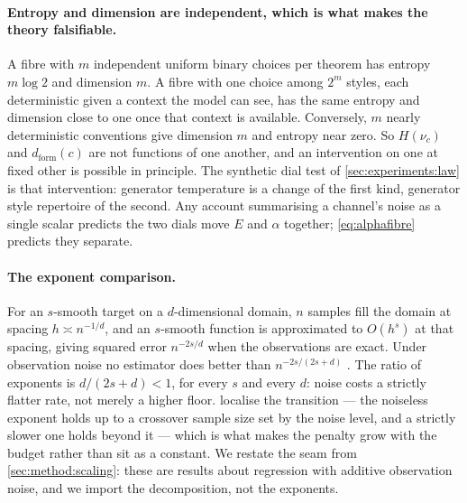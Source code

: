\paragraph{Entropy and dimension are independent, which is what makes the theory
falsifiable.}
A fibre with \(m\) independent uniform binary choices per theorem has entropy
\(m\log 2\) and dimension \(m\).
A fibre with one choice among \(2^{m}\) styles, each deterministic given a
context the model can see, has the same entropy and dimension close to one once
that context is available.
Conversely, \(m\) nearly deterministic conventions give dimension \(m\) and
entropy near zero.
So \(H(\nu_c)\) and \(d_{\mathrm{form}}(c)\) are not functions of one another,
and an intervention on one at fixed other is possible in principle.
The synthetic dial test of \cref{sec:experiments:law} is that intervention:
generator temperature is a change of the first kind, generator style repertoire
of the second.
Any account summarising a channel's noise as a single scalar predicts the two
dials move \(E\) and \(\alpha\) together;
\cref{eq:alphafibre} predicts they separate.

\paragraph{The exponent comparison.}
For an \(s\)-smooth target on a \(d\)-dimensional domain, \(n\) samples fill the
domain at spacing \(h \asymp n^{-1/d}\), and an \(s\)-smooth function is
approximated to \(O(h^{s})\) at that spacing, giving squared error
\(n^{-2s/d}\) when the observations are exact.
Under observation noise no estimator does better than \(n^{-2s/(2s+d)}\)
\citep{stone1982optimalrates, tsybakov2009nonparametric}.
The ratio of exponents is \(d/(2s+d) < 1\), for every \(s\) and every \(d\):
noise costs a strictly flatter rate, not merely a higher floor.
\citet{cui2021noisycrossover} localise the transition --- the noiseless exponent
holds up to a crossover sample size set by the noise level, and a strictly
slower one holds beyond it --- which is what makes the penalty grow with the
budget rather than sit as a constant.
We restate the seam from \cref{sec:method:scaling}:
these are results about regression with additive observation noise, and we
import the decomposition, not the exponents.

